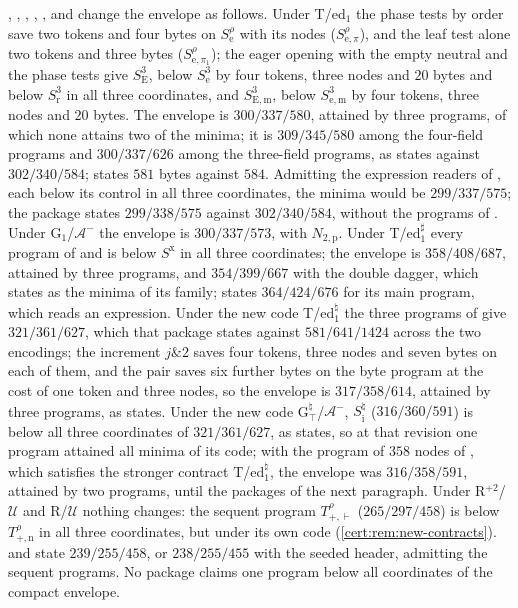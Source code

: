 , , ,
, ,  and
 change the envelope as follows. Under T/ed$_1$ the phase tests
by order save two tokens and four bytes on $S^{\rho}_{\mathrm e}$ with its nodes
($S^{\rho}_{\mathrm e,\pi}$), and the leaf test alone two tokens and three bytes
($S^{\rho}_{\mathrm e,\pi_1}$); the eager opening with the empty neutral and the phase tests
give $S^{3}_{\mathrm E}$, below $S^{3}_{\mathrm e}$ by four tokens, three nodes and $20$
bytes and below $S^{3}_{\mathrm r}$ in all three coordinates, and $S^{3}_{\mathrm{E,m}}$,
below $S^{3}_{\mathrm{e,m}}$ by four tokens, three nodes and $20$ bytes. The envelope is
$300/337/580$, attained by three programs, of which none attains two of the minima; it is
$309/345/580$ among the four-field programs and $300/337/626$ among the three-field
programs, as  states against $302/340/584$;
 states $581$ bytes against $584$. Admitting the expression
readers of , each below its control in all three coordinates,
the minima would be $299/337/575$; the package states $299/338/575$ against $302/340/584$,
without the programs of . Under G$_1$/$\mathcal A^{-}$ the envelope
is $300/337/573$, with $N_{2,\mathrm p}$. Under T/ed$_1^{\sharp}$ every program of
 and  is below $S^{\mathrm x}$ in all three
coordinates; the envelope is $358/408/687$, attained by three programs, and $354/399/667$
with the double dagger, which  states as the minima of its family;
 states $364/424/676$ for its main program, which reads an expression.
Under the new code T/ed$_1^{\natural}$ the three programs of  give
$321/361/627$, which that package states against $581/641/1424$ across the two encodings;
the increment $j\mathbin{\&}2$ saves four tokens, three nodes and seven bytes on each of
them, and the pair saves six further bytes on the byte program at the cost of one token
and three nodes, so the envelope is $317/358/614$, attained by three programs, as
 states. Under the new code G$^{\natural}_{\top}$/$\mathcal A^{-}$,
$S^{\natural}_{\mathrm i}$ ($316/360/591$) is below all three coordinates of $321/361/627$,
as  states, so at that revision one program attained all
minima of its code; with the program of $358$ nodes of , which
satisfies the stronger contract T/ed$_1^{\natural}$, the envelope was $316/358/591$,
attained by two programs, until the packages of the next paragraph. Under R$^{+2}$/$\mathcal U$ and R/$\mathcal U$ nothing changes: the sequent
program $T^{\rho}_{+,\vdash}$ ($265/297/458$) is below $T^{\rho}_{+,\mathrm n}$ in all
three coordinates, but under its own code (\cref{cert:rem:new-contracts}).
 and  state $239/255/458$, or
$238/255/455$ with the seeded header, admitting the sequent programs. No package claims one
program below all coordinates of the compact envelope.

